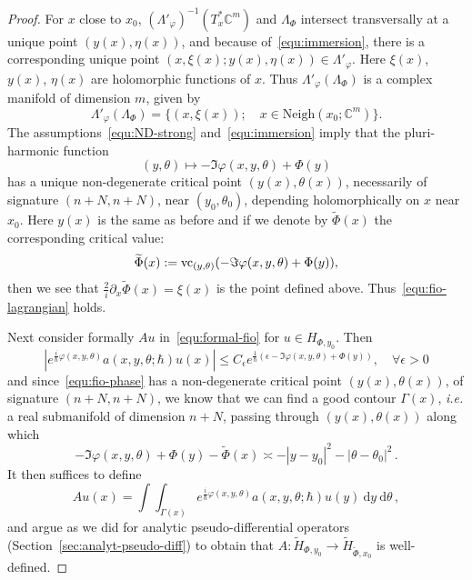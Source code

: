 \documentclass{article}
\newcommand{\Vois}{\mathrm{Neigh}}
\newcommand{\abs}[1]{\left|#1\right|}
\newcommand{\DD}{\:\!\mathrm{d}}
\newcommand{\phy}{\varphi}
\newcommand{\intint}{\int\!\!\!\!\int}
\newcommand{\CM}{\mathbb{C}}
\newcommand{\h}{\hbar}
\begin{document}
\begin{proof}
  For $x$ close to $x_0$, $ (\Lambda'_\phy)^{-1}(T^*_{x}\CM^m)$ and
  $\Lambda_\Phi$ intersect transversally at a unique point
  $(y(x),\eta(x))$, and because of~\eqref{equ:immersion}, there is a
  corresponding unique point
  $(x,\xi(x); y(x),\eta(x))\in \Lambda'_\phy$. Here $\xi(x)$, $y(x)$,
  $\eta(x)$ are holomorphic functions of $x$. Thus
  $\Lambda'_\phy(\Lambda_\Phi)$ is a complex manifold of dimension
  $m$, given by
  \[
  \Lambda'_\phy(\Lambda_\Phi) = \{(x,\xi(x)); \quad
  x\in\Vois(x_0;\CM^m)\}.
  \]
  The assumptions~\eqref{equ:ND-strong} and~\eqref{equ:immersion}
  imply that the pluri-harmonic function
  \begin{equation}
    \label{equ:fio-phase}
    (y,\theta) \mapsto -\Im \phy(x,y,\theta) + \Phi(y)
  \end{equation}
  has a unique non-degenerate critical point $(y(x), \theta(x))$,
  necessarily of signature $(n+N,n+N)$, near $(y_0,\theta_0)$,
  depending holomorphically on $x$ near $x_0$. Here $y(x)$ is the same
  as before and if we denote by $\widetilde \Phi(x)$ the corresponding
  critical value:
  \[
  \widetilde\Phi(x) := \textup{vc}_{(y,\theta)} ( -\Im
  \phy(x,y,\theta) + \Phi(y)),
  \]
  then we see that $\frac{2}{i}\partial_x\widetilde\Phi(x) = \xi(x) $
  is the point defined above. Thus~\eqref{equ:fio-lagrangian} holds.

  Next consider formally $Au$ in~\eqref{equ:formal-fio} for
  $u\in H_{\Phi,y_0}$. Then
  \[
  \abs{e^{\frac{i}{\h}\phy(x,y,\theta)}a(x,y,\theta;\h) u(x)} \leq
  C_\epsilon e^{\frac{1}{\h}(\epsilon-\Im\phy(x,y,\theta) + \Phi(y))},
  \quad \forall \epsilon>0
  \]
  and since~\eqref{equ:fio-phase} has a non-degenerate critical point
  $(y(x),\theta(x))$, of signature $(n+N,n+N)$, we know that we can
  find a good contour $\Gamma(x)$, \emph{i.e.} a real submanifold of
  dimension $n+N$, passing through $(y(x),\theta(x))$ along which
  \[
  -\Im \phy(x,y,\theta) + \Phi(y) - \widetilde\Phi(x) \asymp
  -\abs{y-y_0}^2 - \abs{\theta-\theta_0}^2\,.
  \]
  It then suffices to define
  \begin{equation}
    \label{equ:fio-contour}
    Au(x) = \intint_{\Gamma(x)}
    e^{\frac{i}{\h}\phy(x,y,\theta)}a(x,y,\theta;\h) u(y)
    \DD y \DD \theta\,,
  \end{equation}
  and argue as we did for analytic pseudo-differential operators
  (Section~\ref{sec:analyt-pseudo-diff}) to obtain that
  $A:\widetilde H_{\Phi,y_0}\to \widetilde H_{\widetilde\Phi, x_0}$ is
  well-defined.
\end{proof}
\end{document}
